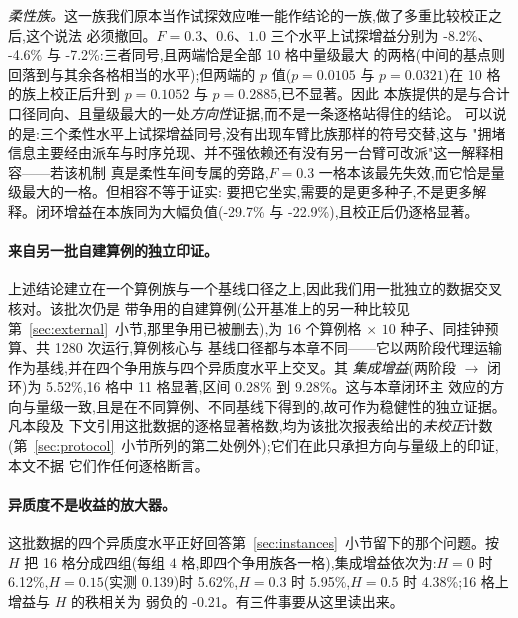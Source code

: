 \documentclass[manuscript,screen,review]{acmart}
\newcommand{\NCases}{10}
\newcommand{\GainProbeFleetBase}{-4.6\%} %
\newcommand{\GainLoopFlexLo}{-29.7\%}    %
\newcommand{\GainLoopFlexHi}{-22.9\%}    %
\newcommand{\GainProbeFlexLo}{-8.2\%}    %
\newcommand{\GainProbeFlexHi}{-7.2\%}    %
\newcommand{\PProbeFlexLoRaw}{=0.0105}
\newcommand{\PProbeFlexLoHolm}{=0.1052}
\newcommand{\PProbeFlexHiRaw}{=0.0321}
\newcommand{\PProbeFlexHiHolm}{=0.2885}
\newcommand{\MatrixCells}{16}
\newcommand{\MatrixRuns}{1280}
\newcommand{\GainIntegMatrix}{5.52\%}    %
\newcommand{\SigIntegMatrix}{11}         %
\newcommand{\GainIntegMatrixLo}{0.28\%}
\newcommand{\GainIntegMatrixHi}{9.28\%}
\newcommand{\GainIntegHZero}{6.12\%}
\newcommand{\GainIntegHLow}{5.62\%}      %
\newcommand{\GainIntegHMid}{5.95\%}      %
\newcommand{\GainIntegHHigh}{4.38\%}     %
\newcommand{\MatrixHMeasLow}{0.139}      %
\newcommand{\RhoIntegH}{-0.21}           %
\begin{document}
\emph{柔性族。}这一族我们原本当作试探效应唯一能作结论的一族,做了多重比较校正之后,这个说法
必须撤回。$F=0.3$、$0.6$、$1.0$ 三个水平上试探增益分别为 \GainProbeFlexLo{}、
\GainProbeFleetBase{} 与 \GainProbeFlexHi{}:三者同号,且两端恰是全部 \NCases{} 格中量级最大
的两格(中间的基点则回落到与其余各格相当的水平);但两端的 $p$ 值($p\PProbeFlexLoRaw$ 与
$p\PProbeFlexHiRaw$)在 \NCases{} 格的族上校正后升到 $p\PProbeFlexLoHolm$ 与
$p\PProbeFlexHiHolm$,已不显著。因此
本族提供的是与合计口径同向、且量级最大的一处\emph{方向性}证据,而不是一条逐格站得住的结论。
可以说的是:三个柔性水平上试探增益同号,没有出现车臂比族那样的符号交替,这与
"拥堵信息主要经由派车与时序兑现、并不强依赖还有没有另一台臂可改派"这一解释相容——若该机制
真是柔性车间专属的旁路,$F=0.3$ 一格本该最先失效,而它恰是量级最大的一格。但相容不等于证实:
要把它坐实,需要的是更多种子,不是更多解释。闭环增益在本族同为大幅负值(\GainLoopFlexLo{} 与
\GainLoopFlexHi{}),且校正后仍逐格显著。

\paragraph{来自另一批自建算例的独立印证。}
上述结论建立在一个算例族与一个基线口径之上,因此我们用一批独立的数据交叉核对。该批次仍是
带争用的自建算例(公开基准上的另一种比较见第~\ref{sec:external}~小节,那里争用已被删去),为
\MatrixCells{} 个算例格 $\times$ $10$ 种子、同挂钟预算、共 \MatrixRuns{} 次运行,算例核心与
基线口径都与本章不同——它以两阶段代理运输作为基线,并在四个争用族与四个异质度水平上交叉。其
\emph{集成增益}(两阶段 $\to$ 闭环)为 \GainIntegMatrix{},\MatrixCells{} 格中
\SigIntegMatrix{} 格显著,区间 \GainIntegMatrixLo{} 到 \GainIntegMatrixHi{}。这与本章闭环主
效应的方向与量级一致,且是在不同算例、不同基线下得到的,故可作为稳健性的独立证据。凡本段及
下文引用这批数据的逐格显著格数,均为该批次报表给出的\emph{未校正}计数
(第~\ref{sec:protocol}~小节所列的第二处例外);它们在此只承担方向与量级上的印证,本文不据
它们作任何逐格断言。

\paragraph{异质度不是收益的放大器。}
这批数据的四个异质度水平正好回答第~\ref{sec:instances}~小节留下的那个问题。按 $H$ 把
\MatrixCells{} 格分成四组(每组 $4$ 格,即四个争用族各一格),集成增益依次为:$H=0$ 时
\GainIntegHZero{},$H=0.15$(实测 \MatrixHMeasLow{})时 \GainIntegHLow{},$H=0.3$ 时
\GainIntegHMid{},$H=0.5$ 时 \GainIntegHHigh{};\MatrixCells{} 格上增益与 $H$ 的秩相关为
弱负的 \RhoIntegH{}。有三件事要从这里读出来。
\end{document}
